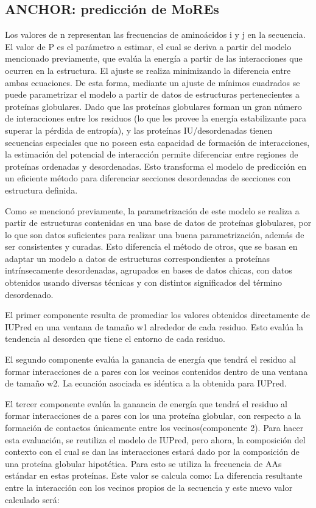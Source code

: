  
 
\subsection{ANCHOR: predicción de MoREs } \label{anchor}


Los valores de n representan las frecuencias de aminoácidos i y j en la secuencia.
El valor de P es el parámetro a estimar, el cual se deriva a partir del modelo mencionado previamente, que evalúa la energía a partir de las interacciones que ocurren en la estructura. 
El ajuste se realiza minimizando la diferencia entre ambas ecuaciones.
De esta forma, mediante un ajuste de mínimos cuadrados se puede parametrizar el modelo a partir de datos de estructuras pertenecientes a proteínas globulares.
Dado que las proteínas globulares forman un gran número de interacciones entre los residuos (lo que les provee la energía estabilizante para superar la pérdida de entropía), 
y las proteínas IU/desordenadas tienen secuencias especiales que no poseen esta capacidad de formación de interacciones, la estimación del potencial de interacción permite diferenciar entre
regiones de proteínas ordenadas y desordenadas. Esto transforma el modelo de predicción en un eficiente método para diferenciar secciones desordenadas de secciones con estructura definida.

Como se mencionó previamente, la parametrización de este modelo se realiza a partir de estructuras contenidas en una base de datos de proteínas globulares, por lo que son datos suficientes
para realizar una buena parametrización, además de ser consistentes y curadas. Esto diferencia el método de otros, que se basan en adaptar un modelo a datos de estructuras correspondientes
a proteínas intrínsecamente desordenadas, agrupados en bases de datos chicas, con datos obtenidos usando diversas técnicas y con distintos significados del término desordenado.

El primer componente resulta de promediar los valores obtenidos directamente de IUPred en una ventana de tamaño w1 alrededor de cada residuo. Esto evalúa la tendencia al desorden
que tiene el entorno de cada residuo.

El segundo componente evalúa la ganancia de energía que tendrá el residuo al formar interacciones de a pares con los vecinos contenidos dentro de una ventana de tamaño w2. 
La ecuación asociada es idéntica a la obtenida para IUPred.

El tercer componente evalúa la ganancia de energía que tendrá el residuo al formar interacciones de a pares con los una proteína globular, con respecto a la formación de contactos únicamente entre los vecinos(componente 2). Para hacer esta evaluación, se reutiliza el modelo de IUPred, pero ahora, la composición del contexto con el cual se dan las interacciones estará dado por la composición de una proteína globular hipotética. Para esto se utiliza la frecuencia de AAs estándar en estas proteínas. Este valor se calcula como:
La diferencia resultante entre la interacción con los vecinos propios de la secuencia y este nuevo valor calculado será:
    

